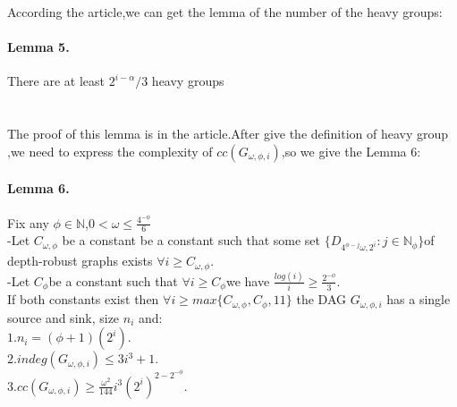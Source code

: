 \documentclass[a4paper, oneside]{article}
\begin{document}
According the article\cite{corrigan2015balloon2},we can get the lemma of the number of the heavy groups:

\paragraph{Lemma 5.}There are at least $2^{i-\alpha}/3$ heavy groups\\
\\ \\
The proof of this lemma is in the article.\cite{corrigan2015balloon2}After give the definition of heavy group ,we need to express the complexity of $cc(G_{\omega,\phi,i})$,so we give the Lemma 6:

\paragraph{Lemma 6.}Fix any $\phi\in \mathbb N$,$0<\omega\le \frac{4^{-\phi}}{6}$\\
-Let $C_{\omega,\phi}$ be a constant be a constant such that some set $\{D_{4^{\phi-j} \omega,2^{i}}:j\in \mathbb N_{\phi}\}$of depth-robust graphs exists $\forall i \ge C_{\omega,\phi}$.\\
-Let $C_{\phi}$be a constant such that $\forall i \ge C_{\phi}$we have $\frac{log(i)}{i} \ge \frac{2^{-\phi}}{3}$.\\
If both constants exist then $\forall i \ge max\{C_{\omega,\phi},C_{\phi},11\}$ the DAG $G_{\omega,\phi,i}$ has a single source and sink, size $n_i$ and:\\
$1.n_i=(\phi+1)(2^i).$\\
$2.indeg(G_{\omega,\phi,i})\le3i^3+1.$\\
$3.cc(G_{\omega,\phi,i})\ge \frac{{\omega}^2}{144}i^3{(2^i)}^{2-2^{-\phi}}.$
\end{document}
